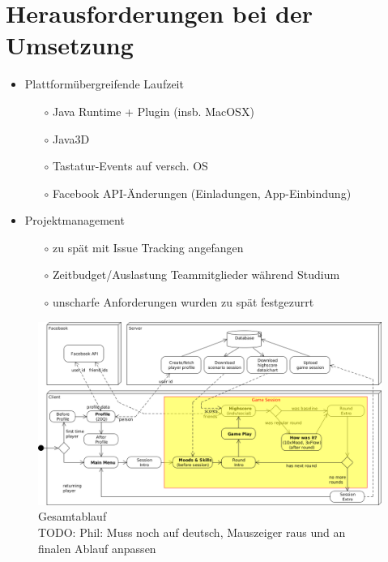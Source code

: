 \documentclass[a4paper,12pt]{scrartcl}
\begin{document}
\section{Herausforderungen bei der Umsetzung}

\begin{itemize}
  \item Plattformübergreifende Laufzeit
  	\begin{itemize}
    	\item[$\circ$] Java Runtime + Plugin (insb. MacOSX)
    	\item[$\circ$] Java3D
		\item[$\circ$] Tastatur-Events auf versch. OS
		\item[$\circ$] Facebook API-Änderungen (Einladungen, App-Einbindung)
  	\end{itemize}
\item Projektmanagement
	\begin{itemize}
  		\item[$\circ$] zu spät mit Issue Tracking angefangen
  		\item[$\circ$] Zeitbudget/Auslastung Teammitglieder während Studium
  		\item[$\circ$] unscharfe Anforderungen wurden zu spät festgezurrt
	\end{itemize}
\end{itemize}

\begin{figure}[htp]
\begin{center}
  \includegraphics[width=\textwidth]{Gesamtablauf.png}
  \caption[Gesamtablauf]{Gesamtablauf\\
TODO: Phil: Muss noch auf deutsch, Mauszeiger raus und an finalen Ablauf anpassen}
  \label{fig:Gesamtablauf}
\end{center}
\end{figure} 


\clearpage

\clearpage
{}
\listoffigures
  
\clearpage
{}
{}

\end{document}
